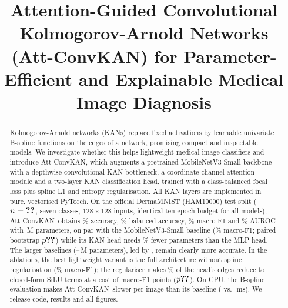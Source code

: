 \documentclass[conference]{IEEEtran}
\newcommand{\ours}{Att-ConvKAN}
\begin{document}
\title{Attention-Guided Convolutional Kolmogorov-Arnold Networks (Att-ConvKAN) for Parameter-Efficient and Explainable Medical Image Diagnosis}

\author{
}

\maketitle

\begin{abstract}
Kolmogorov-Arnold networks (KANs) replace fixed activations by learnable univariate B-spline functions on the edges of a network, promising compact and inspectable models. We investigate whether this helps lightweight medical image classifiers and introduce \ours, which augments a pretrained MobileNetV3-Small backbone with a depthwise convolutional KAN bottleneck, a coordinate-channel attention module and a two-layer KAN classification head, trained with a class-balanced focal loss plus spline L1 and entropy regularisation. All KAN layers are implemented in pure, vectorised PyTorch. On the official DermaMNIST (HAM10000) test split ($n=\res{att_convkan_proposed}{n_test}$, seven classes, $128\times128$ inputs, identical ten-epoch budget for all models), \ours\ obtains \% accuracy, \% balanced accuracy, \% macro-F1 and \% AUROC with \,M parameters, on par with the MobileNetV3-Small baseline (\% macro-F1; paired bootstrap $p\res{paired@mobilenetv3_small}{p_value}$) while its KAN head needs \% fewer parameters than the MLP head. The larger baselines (--\,M parameters), led by \bestbaselinename, remain clearly more accurate. In the ablations, the best lightweight variant is the full architecture without spline regularisation (\% macro-F1); the regulariser makes \% of the head's edges reduce to closed-form SiLU terms at a cost of  macro-F1 points ($p\res{paired@ablation_4_full_no_spline_reg}{p_value}$). On CPU, the B-spline evaluation makes \ours\ slower per image than its baseline ( vs.\ \,ms). We release code, results and all figures.
\end{abstract}
\end{document}
